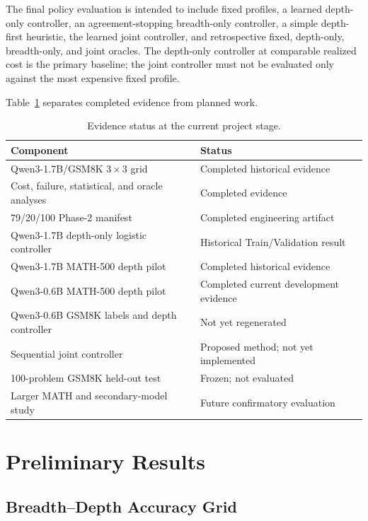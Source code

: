 \documentclass[runningheads]{llncs}
\begin{document}
The final policy evaluation is intended to include fixed profiles, a learned
depth-only controller, an agreement-stopping breadth-only controller, a simple
depth-first heuristic, the learned joint controller, and retrospective fixed,
depth-only, breadth-only, and joint oracles. The depth-only controller at
comparable realized cost is the primary baseline; the joint controller must not
be evaluated only against the most expensive fixed profile.

Table~\ref{tab:status} separates completed evidence from planned work.

\begin{table}
\caption{Evidence status at the current project stage.}
\label{tab:status}
\centering
\begin{tabular}{p{5.0cm}|p{6.0cm}}
\hline
Component & Status \\
\hline
Qwen3-1.7B/GSM8K $3\times3$ grid & Completed historical evidence \\
Cost, failure, statistical, and oracle analyses & Completed evidence \\
79/20/100 Phase-2 manifest & Completed engineering artifact \\
Qwen3-1.7B depth-only logistic controller & Historical Train/Validation result \\
Qwen3-1.7B MATH-500 depth pilot & Completed historical evidence \\
Qwen3-0.6B MATH-500 depth pilot & Completed current development evidence \\
Qwen3-0.6B GSM8K labels and depth controller & Not yet regenerated \\
Sequential joint controller & Proposed method; not yet implemented \\
100-problem GSM8K held-out test & Frozen; not evaluated \\
Larger MATH and secondary-model study & Future confirmatory evaluation \\
\hline
\end{tabular}
\end{table}

\section{Preliminary Results}

\subsection{Breadth--Depth Accuracy Grid}
\end{document}
